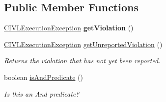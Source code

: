 \subsection*{Public Member Functions}
\begin{DoxyCompactItemize}
\item 
\hypertarget{classedu_1_1udel_1_1cis_1_1vsl_1_1civl_1_1predicate_1_1common_1_1CommonCIVLStatePredicate_aa4185d2faa313de5cce55abe05308a77}{}\hyperlink{classedu_1_1udel_1_1cis_1_1vsl_1_1civl_1_1log_1_1IF_1_1CIVLExecutionException}{C\+I\+V\+L\+Execution\+Exception} {\bfseries get\+Violation} ()\label{classedu_1_1udel_1_1cis_1_1vsl_1_1civl_1_1predicate_1_1common_1_1CommonCIVLStatePredicate_aa4185d2faa313de5cce55abe05308a77}

\item 
\hyperlink{classedu_1_1udel_1_1cis_1_1vsl_1_1civl_1_1log_1_1IF_1_1CIVLExecutionException}{C\+I\+V\+L\+Execution\+Exception} \hyperlink{classedu_1_1udel_1_1cis_1_1vsl_1_1civl_1_1predicate_1_1common_1_1CommonCIVLStatePredicate_a6810ac0792f3cc2ce2aa20c79068543d}{get\+Unreported\+Violation} ()
\begin{DoxyCompactList}\small\item\em Returns the violation that has not yet been reported. \end{DoxyCompactList}\item 
boolean \hyperlink{classedu_1_1udel_1_1cis_1_1vsl_1_1civl_1_1predicate_1_1common_1_1CommonCIVLStatePredicate_a7b1a886d6add65c813ab053872204c59}{is\+And\+Predicate} ()
\begin{DoxyCompactList}\small\item\em Is this an And predicate? \end{DoxyCompactList}\end{DoxyCompactItemize}
